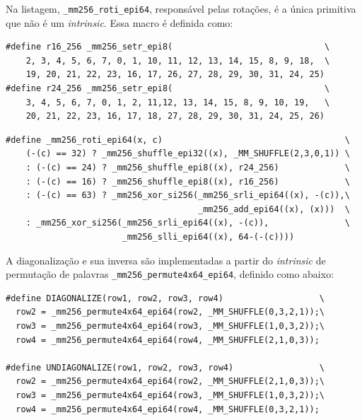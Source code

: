 \documentclass{article}
\begin{document}
Na listagem, \texttt{\_mm256\_roti\_epi64}, responsável pelas rotações, é a
única primitiva que não é um \emph{intrinsic}. Essa macro é definida como:

\begin{small}
\begin{verbatim}
#define r16_256 _mm256_setr_epi8(                              \
    2, 3, 4, 5, 6, 7, 0, 1, 10, 11, 12, 13, 14, 15, 8, 9, 18,  \
    19, 20, 21, 22, 23, 16, 17, 26, 27, 28, 29, 30, 31, 24, 25)
#define r24_256 _mm256_setr_epi8(                              \
    3, 4, 5, 6, 7, 0, 1, 2, 11,12, 13, 14, 15, 8, 9, 10, 19,   \
    20, 21, 22, 23, 16, 17, 18, 27, 28, 29, 30, 31, 24, 25, 26)
\end{verbatim}
\end{small}

\begin{small}
\begin{verbatim}
#define _mm256_roti_epi64(x, c)                                    \
    (-(c) == 32) ? _mm256_shuffle_epi32((x), _MM_SHUFFLE(2,3,0,1)) \
    : (-(c) == 24) ? _mm256_shuffle_epi8((x), r24_256)             \
    : (-(c) == 16) ? _mm256_shuffle_epi8((x), r16_256)             \
    : (-(c) == 63) ? _mm256_xor_si256(_mm256_srli_epi64((x), -(c)),\
                                      _mm256_add_epi64((x), (x)))  \
    : _mm256_xor_si256(_mm256_srli_epi64((x), -(c)),               \
                       _mm256_slli_epi64((x), 64-(-(c))))
\end{verbatim}
\end{small}

A diagonalização e sua inversa são implementadas a partir do \emph{intrinsic}
de permutação de palavras \texttt{\_mm256\_permute4x64\_epi64}, definido como abaixo:

\begin{small}
\begin{verbatim}
#define DIAGONALIZE(row1, row2, row3, row4)                   \
  row2 = _mm256_permute4x64_epi64(row2, _MM_SHUFFLE(0,3,2,1));\
  row3 = _mm256_permute4x64_epi64(row3, _MM_SHUFFLE(1,0,3,2));\
  row4 = _mm256_permute4x64_epi64(row4, _MM_SHUFFLE(2,1,0,3));

#define UNDIAGONALIZE(row1, row2, row3, row4)                 \
  row2 = _mm256_permute4x64_epi64(row2, _MM_SHUFFLE(2,1,0,3));\
  row3 = _mm256_permute4x64_epi64(row3, _MM_SHUFFLE(1,0,3,2));\
  row4 = _mm256_permute4x64_epi64(row4, _MM_SHUFFLE(0,3,2,1));
\end{verbatim}
\end{small}
\end{document}
